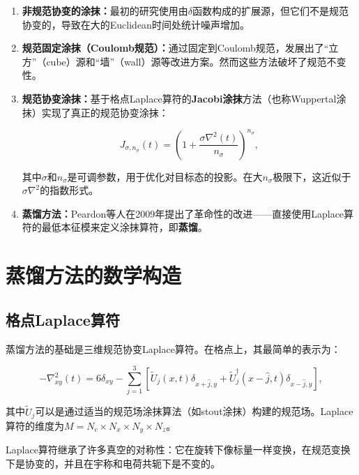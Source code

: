 \documentclass[12pt,a4paper]{ctexart}
\theoremstyle{definition}
\begin{document}
\begin{enumerate}
    \item \textbf{非规范协变的涂抹：}最初的研究使用由$\delta$函数构成的扩展源，但它们不是规范协变的，导致在大的Euclidean时间处统计噪声增加。

    \item \textbf{规范固定涂抹（Coulomb规范）：}通过固定到Coulomb规范，发展出了``立方''（cube）源和``墙''（wall）源等改进方案。然而这些方法破坏了规范不变性。

    \item \textbf{规范协变涂抹：}基于格点Laplace算符的\textbf{Jacobi涂抹}方法\cite{UKQCD1993}（也称Wuppertal涂抹）实现了真正的规范协变涂抹：

    \begin{equation}
    J_{\sigma, n_\sigma}(t) = \left(1 + \frac{\sigma\nabla^2(t)}{n_\sigma}\right)^{n_\sigma},
    \label{eq:jacobi_kernel}
    \end{equation}

    其中$\sigma$和$n_\sigma$是可调参数，用于优化对目标态的投影。在大$n_\sigma$极限下，这近似于$\sigma\nabla^2$的指数形式。

    \item \textbf{蒸馏方法：}Peardon等人\cite{Peardon2009}在2009年提出了革命性的改进——直接使用Laplace算符的最低本征模来定义涂抹算符，即\textbf{蒸馏}。
\end{enumerate}

\section{蒸馏方法的数学构造}

\subsection{格点Laplace算符}

蒸馏方法的基础是三维规范协变Laplace算符\cite{Peardon2009,NoteGluonPDFs}。在格点上，其最简单的表示为：

\begin{equation}
-\nabla^2_{xy}(t) = 6\delta_{xy} - \sum_{j=1}^{3} \left[\tilde{U}_j(x,t)\delta_{x+\hat{j},y} + \tilde{U}^\dagger_j(x-\hat{j},t)\delta_{x-\hat{j},y}\right],
\label{eq:laplacian}
\end{equation}

其中$\tilde{U}_j$可以是通过适当的规范场涂抹算法（如stout涂抹）构建的规范场。Laplace算符的维度为$M = N_c \times N_x \times N_y \times N_z$。

Laplace算符继承了许多真空的对称性：它在旋转下像标量一样变换，在规范变换下是协变的，并且在宇称和电荷共轭下是不变的\cite{Peardon2009}。
\end{document}

